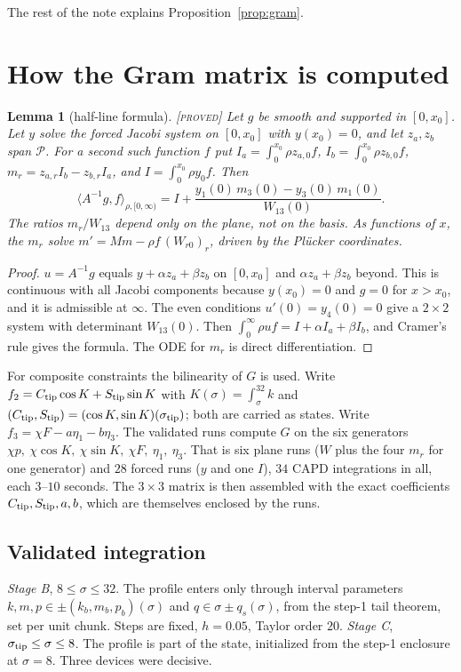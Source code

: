 \documentclass[11pt]{amsart}
\newtheorem{lemma}[theorem]{Lemma}
\theoremstyle{definition}
\theoremstyle{remark}
\newcommand{\ip}[2]{\langle #1,#2\rangle}
\newcommand{\lab}[1]{\textup{\textsc{[#1]}}}
\newcommand{\stip}{\sigma_{\rm tip}}
\begin{document}
The rest of the note explains Proposition~\ref{prop:gram}.

\section{How the Gram matrix is computed}\label{sec:gram}

\begin{lemma}[half-line formula]\label{lem:formula}\lab{proved}
Let $g$ be smooth and supported in $[0,x_0]$. Let $y$ solve the forced Jacobi system on $[0,x_0]$ with $y(x_0)=0$, and let $z_a,z_b$ span $\mathcal P$. For a second such function $f$ put $I_a=\int_0^{x_0}\rho z_{a,0}f$, $I_b=\int_0^{x_0}\rho z_{b,0}f$, $m_r=z_{a,r}I_b-z_{b,r}I_a$, and $I=\int_0^{x_0}\rho y_0f$. Then
\[
\ip{A^{-1}g}{f}_{\rho,[0,\infty)}=I+\frac{y_1(0)\,m_3(0)-y_3(0)\,m_1(0)}{W_{13}(0)}.
\]
The ratios $m_r/W_{13}$ depend only on the plane, not on the basis. As functions of $x$, the $m_r$ solve $m'=Mm-\rho f\,(W_{r0})_r$, driven by the Pl\"ucker coordinates.
\end{lemma}
\begin{proof}
$u=A^{-1}g$ equals $y+\alpha z_a+\beta z_b$ on $[0,x_0]$ and $\alpha z_a+\beta z_b$ beyond. This is continuous with all Jacobi components because $y(x_0)=0$ and $g=0$ for $x>x_0$, and it is admissible at $\infty$. The even conditions $u'(0)=y_4(0)=0$ give a $2\times2$ system with determinant $W_{13}(0)$. Then $\int_0^\infty\rho uf=I+\alpha I_a+\beta I_b$, and Cramer's rule gives the formula. The ODE for $m_r$ is direct differentiation.
\end{proof}

For composite constraints the bilinearity of $G$ is used. Write $f_2=C_{\rm tip}\cos K+S_{\rm tip}\sin K$ with $K(\sigma)=\int_\sigma^{32}k$ and $(C_{\rm tip},S_{\rm tip})=(\cos K,\sin K)(\stip)$; both are carried as states. Write $f_3=\chi F-a\eta_1-b\eta_3$. The validated runs compute $G$ on the six generators $\chi p,\ \chi\cos K,\ \chi\sin K,\ \chi F,\ \eta_1,\ \eta_3$. That is six plane runs ($W$ plus the four $m_r$ for one generator) and $28$ forced runs ($y$ and one $I$), $34$ CAPD integrations in all, each $3$--$10$ seconds. The $3\times3$ matrix is then assembled with the exact coefficients $C_{\rm tip},S_{\rm tip},a,b$, which are themselves enclosed by the runs.

\subsection*{Validated integration}
\emph{Stage B}, $8\le\sigma\le32$. The profile enters only through interval parameters $k,m,p\in\pm(k_b,m_b,p_b)(\sigma)$ and $q\in\sigma\pm q_s(\sigma)$, from the step-1 tail theorem, set per unit chunk. Steps are fixed, $h=0.05$, Taylor order $20$. \emph{Stage C}, $\stip\le\sigma\le8$. The profile is part of the state, initialized from the step-1 enclosure at $\sigma=8$. Three devices were decisive.
\end{document}
